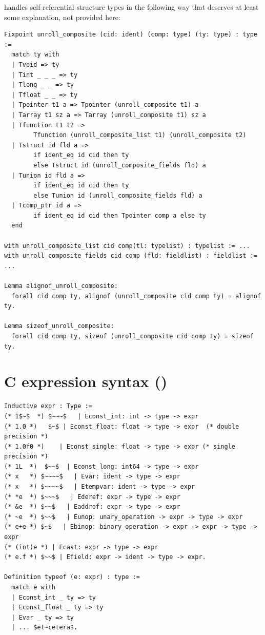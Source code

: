 \documentclass[12pt,fleqn,openany,oneside,showtrims]{memoir}
\newcommand{\ychapter}[2]{\chapter[#1]{#1 \hfill \normalsize #2}}
\begin{document}
\clearpage
{} handles self-referential structure types
in the following way that deserves at least some explanation,
not provided here:
\begin{lstlisting}
Fixpoint unroll_composite (cid: ident) (comp: type) (ty: type) : type :=
  match ty with
  | Tvoid => ty
  | Tint _ _ _ => ty
  | Tlong _ _ => ty
  | Tfloat _ _ => ty
  | Tpointer t1 a => Tpointer (unroll_composite t1) a
  | Tarray t1 sz a => Tarray (unroll_composite t1) sz a
  | Tfunction t1 t2 => 
        Tfunction (unroll_composite_list t1) (unroll_composite t2)
  | Tstruct id fld a => 
        if ident_eq id cid then ty 
        else Tstruct id (unroll_composite_fields fld) a
  | Tunion id fld a => 
        if ident_eq id cid then ty 
        else Tunion id (unroll_composite_fields fld) a
  | Tcomp_ptr id a => 
        if ident_eq id cid then Tpointer comp a else ty
  end

with unroll_composite_list cid comp(tl: typelist) : typelist := ...
with unroll_composite_fields cid comp (fld: fieldlist) : fieldlist := ...

Lemma alignof_unroll_composite:
  forall cid comp ty, alignof (unroll_composite cid comp ty) = alignof ty.

Lemma sizeof_unroll_composite:
  forall cid comp ty, sizeof (unroll_composite cid comp ty) = sizeof ty.
\end{lstlisting}
\ychapter{C expression syntax}{(\file{compcert/cfrontend/Clight.v})}

\begin{lstlisting}
Inductive expr : Type :=
(* 1$~$  *) $~~~$   | Econst_int: int -> type -> expr      
(* 1.0 *)   $~$ | Econst_float: float -> type -> expr  (* double precision *)
(* 1.0f0 *)    | Econst_single: float -> type -> expr (* single precision *)
(* 1L  *)  $~~$  | Econst_long: int64 -> type -> expr
(* x   *) $~~~~$   | Evar: ident -> type -> expr         
(* x   *) $~~~~$   | Etempvar: ident -> type -> expr     
(* *e  *) $~~~$   | Ederef: expr -> type -> expr        
(* &e  *) $~~$   | Eaddrof: expr -> type -> expr       
(* ~e  *) $~~$   | Eunop: unary_operation -> expr -> type -> expr
(* e+e *) $~$   | Ebinop: binary_operation -> expr -> expr -> type -> expr 
(* (int)e *) | Ecast: expr -> type -> expr  
(* e.f *) $~~$ | Efield: expr -> ident -> type -> expr. 

Definition typeof (e: expr) : type :=
  match e with
  | Econst_int _ ty => ty
  | Econst_float _ ty => ty
  | Evar _ ty => ty
  | ... $et~cetera$.
\end{lstlisting}
\end{document}
